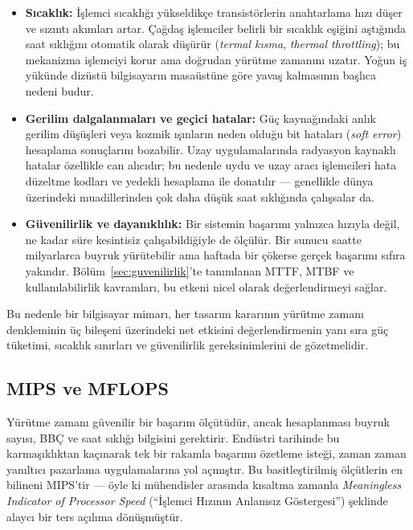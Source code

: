 \begin{itemize}
    \item \textbf{Sıcaklık:} İşlemci sıcaklığı yükseldikçe transistörlerin anahtarlama hızı düşer ve sızıntı akımları artar. Çağdaş işlemciler belirli bir sıcaklık eşiğini aştığında saat sıklığını otomatik olarak düşürür (\emph{termal kısma}, \emph{thermal throttling}); bu mekanizma işlemciyi korur ama doğrudan yürütme zamanını uzatır. Yoğun iş yükünde dizüstü bilgisayarın masaüstüne göre yavaş kalmasının başlıca nedeni budur.

    \item \textbf{Gerilim dalgalanmaları ve geçici hatalar:} Güç kaynağındaki anlık gerilim düşüşleri veya kozmik ışınların neden olduğu bit hataları (\emph{soft error}) hesaplama sonuçlarını bozabilir. Uzay uygulamalarında radyasyon kaynaklı hatalar özellikle can alıcıdır; bu nedenle uydu ve uzay aracı işlemcileri hata düzeltme kodları ve yedekli hesaplama ile donatılır --- genellikle dünya üzerindeki muadillerinden çok daha düşük saat sıklığında çalışsalar da.

    \item \textbf{Güvenilirlik ve dayanıklılık:} Bir sistemin başarımı yalnızca hızıyla değil, ne kadar süre kesintisiz çalışabildiğiyle de ölçülür. Bir sunucu saatte milyarlarca buyruk yürütebilir ama haftada bir çökerse gerçek başarımı sıfıra yakındır. Bölüm~\ref{sec:guvenilirlik}'te tanımlanan MTTF, MTBF ve kullanılabilirlik kavramları, bu etkeni nicel olarak değerlendirmeyi sağlar.
\end{itemize}

Bu nedenle bir bilgisayar mimarı, her tasarım kararının yürütme zamanı denkleminin üç bileşeni üzerindeki net etkisini değerlendirmenin yanı sıra güç tüketimi, sıcaklık sınırları ve güvenilirlik gereksinimlerini de gözetmelidir.


\subsection{MIPS ve MFLOPS}
\label{subsec:mips-mflops}

Yürütme zamanı güvenilir bir başarım ölçütüdür, ancak hesaplanması buyruk sayısı, BBÇ ve saat sıklığı bilgisini gerektirir. Endüstri tarihinde bu karmaşıklıktan kaçınarak tek bir rakamla başarımı özetleme isteği, zaman zaman yanıltıcı pazarlama uygulamalarına yol açmıştır. Bu basitleştirilmiş ölçütlerin en bilineni MIPS'tir --- öyle ki mühendisler arasında kısaltma zamanla \emph{Meaningless Indicator of Processor Speed} (``İşlemci Hızının Anlamsız Göstergesi'') şeklinde alaycı bir ters açılıma dönüşmüştür.

